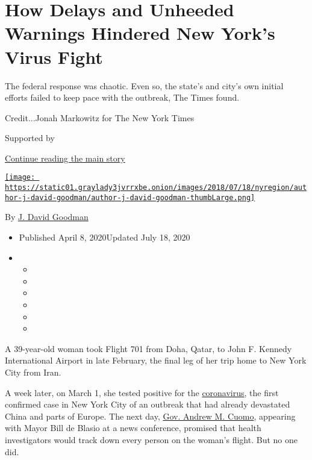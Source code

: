 \hypertarget{how-delays-and-unheeded-warnings-hindered-new-yorks-virus-fight}{%
\section{How Delays and Unheeded Warnings Hindered New York's Virus
Fight}\label{how-delays-and-unheeded-warnings-hindered-new-yorks-virus-fight}}

The federal response was chaotic. Even so, the state's and city's own
initial efforts failed to keep pace with the outbreak, The Times found.

Credit...Jonah Markowitz for The New York Times

Supported by

\protect\hyperlink{after-sponsor}{Continue reading the main story}

\href{https://www.nytimes3xbfgragh.onion/by/j-david-goodman}{\texttt{[image: https://static01.graylady3jvrrxbe.onion/images/2018/07/18/nyregion/author-j-david-goodman/author-j-david-goodman-thumbLarge.png]}}

By \href{https://www.nytimes3xbfgragh.onion/by/j-david-goodman}{J. David
Goodman}

\begin{itemize}
\item
  Published April 8, 2020Updated July 18, 2020
\item
  \begin{itemize}
  \item
  \item
  \item
  \item
  \item
  \item
  \end{itemize}
\end{itemize}

A 39-year-old woman took Flight 701 from Doha, Qatar, to John F. Kennedy
International Airport in late February, the final leg of her trip home
to New York City from Iran.

A week later, on March 1, she tested positive for the
\href{https://www.nytimes3xbfgragh.onion/2020/07/13/upshot/coronavirus-response-fax-machines.html}{coronavirus},
the first confirmed case in New York City of an outbreak that had
already devastated China and parts of Europe. The next day,
\href{https://www.nytimes3xbfgragh.onion/2020/04/09/style/cuomo-ny-tough-video-coronavirus.html}{Gov.
Andrew M. Cuomo}, appearing with Mayor Bill de Blasio at a news
conference, promised that health investigators would track down every
person on the woman's flight. But no one did.

